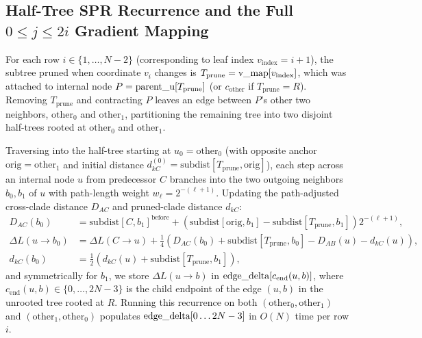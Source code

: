 \documentclass[11pt,a4paper]{article}
\makeatletter
\DeclareRobustCommand{\_}{\ifmmode\nfss@text{\textunderscore}\else\textunderscore\allowbreak\fi}
\theoremstyle{definition}
\makeatother
\begin{document}
\subsection{Half-Tree SPR Recurrence and the Full $0 \le j \le 2i$ Gradient Mapping}

For each row $i \in \{1, \dots, N-2\}$ (corresponding to leaf index $v_{\text{index}} = i + 1$), the subtree pruned when coordinate $v_i$ changes is $T_{\text{prune}} = \text{v\_map}[v_{\text{index}}]$, which was attached to internal node $P = \text{parent\_u}[T_{\text{prune}}]$ (or $c_{\text{other}}$ if $T_{\text{prune}} = R$). Removing $T_{\text{prune}}$ and contracting $P$ leaves an edge between $P$'s other two neighbors, $\text{other}_0$ and $\text{other}_1$, partitioning the remaining tree into two disjoint half-trees rooted at $\text{other}_0$ and $\text{other}_1$.

Traversing into the half-tree starting at $u_0 = \text{other}_0$ (with opposite anchor $\text{orig} = \text{other}_1$ and initial distance $d_{kC}^{(0)} = \text{subdist}[T_{\text{prune}}, \text{orig}]$), each step across an internal node $u$ from predecessor $C$ branches into the two outgoing neighbors $b_0, b_1$ of $u$ with path-length weight $w_\ell = 2^{-(\ell + 1)}$. Updating the path-adjusted cross-clade distance $D_{AC}$ and pruned-clade distance $d_{kC}$:
\begin{align}
D_{AC}(b_0) &= \text{subdist}[C, b_1]^{\text{before}} + \left(\text{subdist}[\text{orig}, b_1] - \text{subdist}[T_{\text{prune}}, b_1]\right) 2^{-(\ell+1)}, \nonumber \\
\Delta L(u \to b_0) &= \Delta L(C \to u) + \frac{1}{4}\left(D_{AC}(b_0) + \text{subdist}[T_{\text{prune}}, b_0] - D_{AB}(u) - d_{kC}(u)\right), \nonumber \\
d_{kC}(b_0) &= \frac{1}{2}\left(d_{kC}(u) + \text{subdist}[T_{\text{prune}}, b_1]\right),
\label{eq:spr_recurrence}
\end{align}
and symmetrically for $b_1$, we store $\Delta L(u \to b)$ in $\text{edge\_delta}[c_{\text{end}}(u, b)]$, where $c_{\text{end}}(u, b) \in \{0, \dots, 2N-3\}$ is the child endpoint of the edge $(u, b)$ in the unrooted tree rooted at $R$. Running this recurrence on both $(\text{other}_0, \text{other}_1)$ and $(\text{other}_1, \text{other}_0)$ populates $\text{edge\_delta}[0 \dots 2N-3]$ in $O(N)$ time per row $i$.
\end{document}
